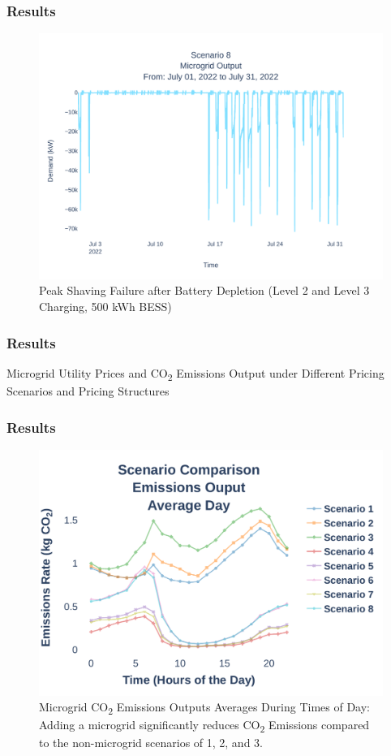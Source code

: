 \documentclass[aspectratio=169, 8 pt]{beamer}
\begin{document}
		\begin{frame}
			\frametitle{Results}
			\begin{figure}
				\centering
				\includegraphics[width=0.7\linewidth]{Fig/Option_3/4_Scenario_8_Run_3_Mg_Output_Jul_01_2022_to_Jul_31_2022.pdf}
				\caption{\footnotesize Peak Shaving Failure after Battery Depletion (Level 2 and Level 3 Charging, 500 kWh BESS)}
				\label{fig:scenario4peakshaving}
			\end{figure}
		\end{frame}
		
		\begin{frame}
			\frametitle{Results}
			\begin{table}
				\caption{Microgrid Utility Prices and CO\textsubscript{2} Emissions Output under Different Pricing Scenarios and Pricing Structures}
				\centering
				\large
				
				\label{tab:emissions}
			\end{table}
		\end{frame}
		
		\begin{frame}
			\frametitle{Results}
			\begin{figure}
				\centering
				\includegraphics[width=0.7\linewidth]{Fig/Option_3/emissions_scenario_comparison_run_3_large_font.pdf}
				\caption{Microgrid CO\textsubscript{2} Emissions Outputs Averages During Times of Day: Adding a microgrid significantly reduces CO\textsubscript{2} Emissions compared to the non-microgrid scenarios of 1, 2, and 3.}
				\label{fig:emissions_output}
			\end{figure}
		\end{frame}
\end{document}

